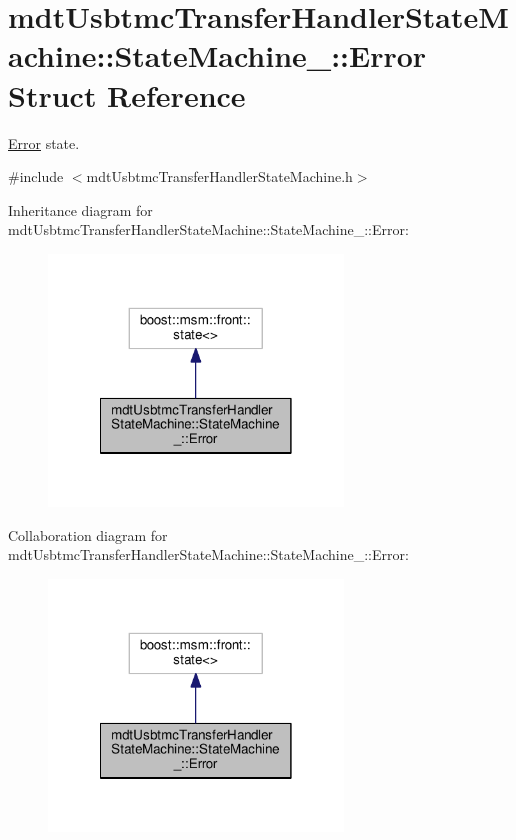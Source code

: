 \hypertarget{structmdt_usbtmc_transfer_handler_state_machine_1_1_state_machine___1_1_error}{\section{mdt\-Usbtmc\-Transfer\-Handler\-State\-Machine\-:\-:State\-Machine\-\_\-\-:\-:Error Struct Reference}
\label{structmdt_usbtmc_transfer_handler_state_machine_1_1_state_machine___1_1_error}
}


\hyperlink{structmdt_usbtmc_transfer_handler_state_machine_1_1_state_machine___1_1_error}{Error} state.  




{\ttfamily \#include $<$mdt\-Usbtmc\-Transfer\-Handler\-State\-Machine.\-h$>$}



Inheritance diagram for mdt\-Usbtmc\-Transfer\-Handler\-State\-Machine\-:\-:State\-Machine\-\_\-\-:\-:Error\-:
\nopagebreak
\begin{figure}[H]
\begin{center}
\leavevmode
\includegraphics[width=222pt]{structmdt_usbtmc_transfer_handler_state_machine_1_1_state_machine___1_1_error__inherit__graph}
\end{center}
\end{figure}


Collaboration diagram for mdt\-Usbtmc\-Transfer\-Handler\-State\-Machine\-:\-:State\-Machine\-\_\-\-:\-:Error\-:
\nopagebreak
\begin{figure}[H]
\begin{center}
\leavevmode
\includegraphics[width=222pt]{structmdt_usbtmc_transfer_handler_state_machine_1_1_state_machine___1_1_error__coll__graph}
\end{center}
\end{figure}
